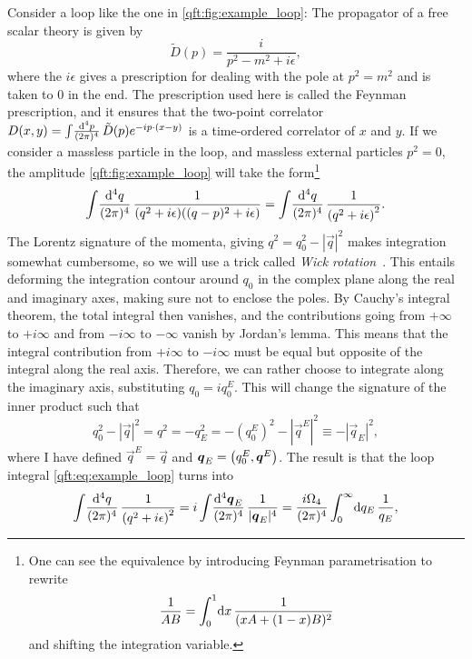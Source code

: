 \documentclass[../main.tex]{subfiles}
\begin{document}
Consider a loop like the one in \cref{qft:fig:example_loop}:
The propagator of a free scalar theory is given by~\cite{Schwartz:2014sze}
\begin{equation}
  \tilde{D}(p) = \frac{i}{p^2 - m^2 + i \epsilon},
\end{equation}
where the \(i\epsilon\) gives a prescription for dealing with the pole at \(p^2 = m^2\) and is taken to 0 in the end.
The prescription used here is called the Feynman prescription, and it ensures that the two-point correlator \(D(x,y) = \loopintegral{p}\tilde{D}(p) \exp{-ip\cdot(x-y)}\) is a time-ordered correlator of \(x\) and \(y\).
If we consider a massless particle in the loop, and massless external particles \(p^2 = 0\), the amplitude \cref{qft:fig:example_loop} will take the form\footnote{One can see the equivalence by introducing Feynman parametrisation to rewrite \[\frac{1}{AB} = \integral[_0^1]{x} \frac{1}{(xA + (1-x)B)^2}\] and shifting the integration variable.}
\begin{equation}
  \label{qft:eq:example_loop}
  \loopintegral[4]{q} \frac{1}{(q^2+i\epsilon)((q-p)^2+i\epsilon)} = \loopintegral[4]{q} \frac{1}{\pclosed{q^2 + i\epsilon}^2}.
\end{equation}
The Lorentz signature of the momenta, giving \(q^2 = q_0^2 - |\vec{q}|^2\) makes integration somewhat cumbersome, so we will use a trick called \emph{Wick rotation}~\cite{Schwartz:2014sze}.
This entails deforming the integration contour around \(q_0\) in the complex plane along the real and imaginary axes, making sure not to enclose the poles.
By Cauchy's integral theorem, the total integral then vanishes, and the contributions going from \(+\infty\) to \(+i\infty\) and from \(-i\infty\) to \(-\infty\) vanish by Jordan's lemma.
This means that the integral contribution from \(+i\infty\) to \(-i\infty\) must be equal but opposite of the integral along the real axis.
Therefore, we can rather choose to integrate along the imaginary axis, substituting \(q_0 = iq_0^E\).
This will change the signature of the inner product such that
\begin{equation}
  q_0^2 - |\vec{q}|^2 = q^2 = -q_E^2 = -(q_0^E)^2 - |\vec{q}^E|^2 \equiv -|\vec{q}_E|^2,
\end{equation}
where I have defined \(\vec{q}^E = \vec{q}\) and \(\vec{q}_E = \pclosed{q_0^E, \vec{q}^E}\).
The result is that the loop integral \cref{qft:eq:example_loop} turns into
\begin{equation}
  \loopintegral[4]{q} \frac{1}{\pclosed{q^2 + i\epsilon}^2} = i\loopintegral[4]{\vec{q}_E} \frac{1}{|\vec{q}_E|^4} = \frac{i\Omega_4}{(2\pi)^4} \integral[_0^\infty]{q_E} \frac{1}{q_E},
\end{equation}
\end{document}
